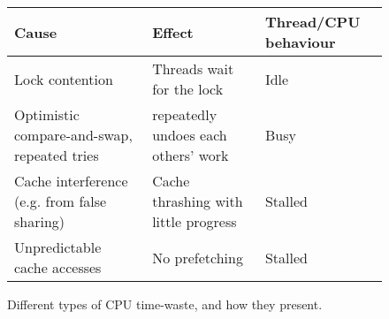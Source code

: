 \begin{figure}[hbtp]
\centering
\begin{tabular}{|p{4cm}|p{4cm}|p{3cm}|}
\hline
Cause & Effect & Thread/CPU behaviour \\
\hline
\hline
Lock contention & Threads wait for the lock & Idle \\
\hline
Optimistic compare-and-swap, repeated tries & repeatedly undoes each others' work
& Busy \\
\hline
Cache interference (e.g. from false sharing)& Cache thrashing with
little progress & Stalled \\
\hline
Unpredictable cache accesses & No prefetching & Stalled \\
\hline
\end{tabular}
	\caption{Different types of CPU time-waste, and how they present.}
	\label{table:timewaste}
\end{figure}
